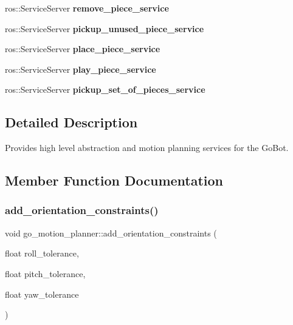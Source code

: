 \begin{DoxyCompactItemize}
\mbox{\label{classgo__motion__planner_a501d1bdebd834499d44f0871eb383023}} 
ros\+::\+Service\+Server {\bfseries remove\+\_\+piece\+\_\+service}
\item 
\mbox{\label{classgo__motion__planner_acebfcd65ac745bf93283e42ba9bc4f6e}} 
ros\+::\+Service\+Server {\bfseries pickup\+\_\+unused\+\_\+piece\+\_\+service}
\item 
\mbox{\label{classgo__motion__planner_afa40a53763c75833b68927e9c2d02f6c}} 
ros\+::\+Service\+Server {\bfseries place\+\_\+piece\+\_\+service}
\item 
\mbox{\label{classgo__motion__planner_a82f558953e429bef973c534fef819757}} 
ros\+::\+Service\+Server {\bfseries play\+\_\+piece\+\_\+service}
\item 
\mbox{\label{classgo__motion__planner_ab8d76cd26fa320f3ac579b14eb661b8b}} 
ros\+::\+Service\+Server {\bfseries pickup\+\_\+set\+\_\+of\+\_\+pieces\+\_\+service}
\end{DoxyCompactItemize}


\subsection{Detailed Description}
Provides high level abstraction and motion planning services for the Go\+Bot. 

\subsection{Member Function Documentation}
\mbox{\label{classgo__motion__planner_a14a615472cc4daae8049627c4aacf1e2}} 
\subsubsection{\texorpdfstring{add\+\_\+orientation\+\_\+constraints()}{add\_orientation\_constraints()}}
{\footnotesize\ttfamily void go\+\_\+motion\+\_\+planner\+::add\+\_\+orientation\+\_\+constraints (\begin{DoxyParamCaption}\item[{float}]{roll\+\_\+tolerance,  }\item[{float}]{pitch\+\_\+tolerance,  }\item[{float}]{yaw\+\_\+tolerance }\end{DoxyParamCaption})}




